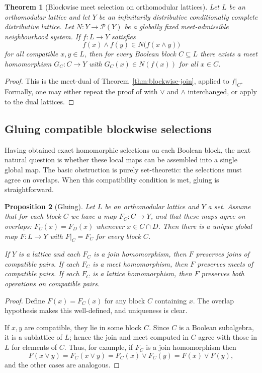 \documentclass[11pt]{amsart}
\newtheorem{theorem}{Theorem}[section]
\newtheorem{proposition}[theorem]{Proposition}
\theoremstyle{definition}
\newcommand{\join}{\vee}
\newcommand{\meet}{\wedge}
\newcommand{\Pow}{\mathcal{P}}
\begin{document}
\begin{theorem}[Blockwise meet selection on orthomodular lattices]\label{thm:blockwise-meet}
Let $L$ be an orthomodular lattice and let $Y$ be an infinitarily distributive conditionally complete distributive lattice.
Let $N\colon Y\to\Pow(Y)$ be a globally fixed meet-admissible neighbourhood system.
If $f\colon L\to Y$ satisfies
\[
f(x)\meet f(y)\in N\bigl(f(x\meet y)\bigr)
\]
for all compatible $x,y\in L$, then for every Boolean block $C\subseteq L$ there exists a meet homomorphism
$G_C\colon C\to Y$ with $G_C(x)\in N(f(x))$ for all $x\in C$.
\end{theorem}

\begin{proof}
This is the meet-dual of Theorem~\ref{thm:blockwise-join}, applied to $f|_C$.
Formally, one may either repeat the proof of \cite[Theorem~8]{BKP} with $\join$ and $\meet$ interchanged, or apply \cite{BKP} to the dual lattices.
\end{proof}

\subsection{Gluing compatible blockwise selections}
Having obtained exact homomorphic selections on each Boolean block, the next natural question
is whether these local maps can be assembled into a single global map.
The basic obstruction is purely set-theoretic: the selections must agree on overlaps.
When this compatibility condition is met, gluing is straightforward.

\begin{proposition}[Gluing]\label{prop:gluing}
Let $L$ be an orthomodular lattice and $Y$ a set.
Assume that for each block $C$ we have a map $F_C\colon C\to Y$, and that these maps agree on overlaps:
$F_C(x)=F_D(x)$ whenever $x\in C\cap D$.
Then there is a unique global map $F\colon L\to Y$ with $F|_C=F_C$ for every block $C$.

If $Y$ is a lattice and each $F_C$ is a join homomorphism, then $F$ preserves joins of compatible pairs.
If each $F_C$ is a meet homomorphism, then $F$ preserves meets of compatible pairs.
If each $F_C$ is a lattice homomorphism, then $F$ preserves both operations on compatible pairs.
\end{proposition}

\begin{proof}
Define $F(x)=F_C(x)$ for any block $C$ containing $x$.
The overlap hypothesis makes this well-defined, and uniqueness is clear.

If $x,y$ are compatible, they lie in some block $C$.
Since $C$ is a Boolean subalgebra, it is a sublattice of $L$; hence the join and meet computed in $C$ agree with those in $L$ for elements of $C$.
Thus, for example, if $F_C$ is a join homomorphism then
\[
F(x\join y)=F_C(x\join y)=F_C(x)\join F_C(y)=F(x)\join F(y),
\]
and the other cases are analogous.
\end{proof}
\end{document}
